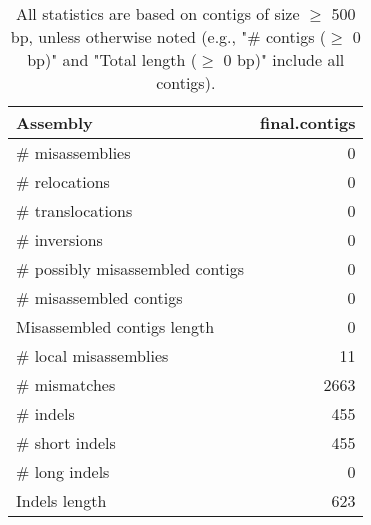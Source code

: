 \documentclass[12pt,a4paper]{article}
\begin{document}
\begin{table}[ht]
\begin{center}
\caption{All statistics are based on contigs of size $\geq$ 500 bp, unless otherwise noted (e.g., "\# contigs ($\geq$ 0 bp)" and "Total length ($\geq$ 0 bp)" include all contigs).}
\begin{tabular}{|l*{1}{|r}|}
\hline
Assembly & final.contigs \\ \hline
\# misassemblies & 0 \\ \hline
\hspace{5mm}\# relocations & 0 \\ \hline
\hspace{5mm}\# translocations & 0 \\ \hline
\hspace{5mm}\# inversions & 0 \\ \hline
\# possibly misassembled contigs & 0 \\ \hline
\# misassembled contigs & 0 \\ \hline
Misassembled contigs length & 0 \\ \hline
\# local misassemblies & 11 \\ \hline
\# mismatches & 2663 \\ \hline
\# indels & 455 \\ \hline
\hspace{5mm}\# short indels & 455 \\ \hline
\hspace{5mm}\# long indels & 0 \\ \hline
Indels length & 623 \\ \hline
\end{tabular}
\end{center}
\end{table}
\end{document}
